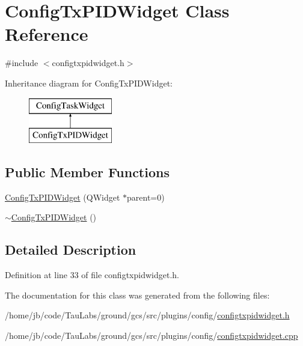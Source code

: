 \hypertarget{class_config_tx_p_i_d_widget}{\section{\-Config\-Tx\-P\-I\-D\-Widget \-Class \-Reference}
\label{class_config_tx_p_i_d_widget}
}


{\ttfamily \#include $<$configtxpidwidget.\-h$>$}

\-Inheritance diagram for \-Config\-Tx\-P\-I\-D\-Widget\-:\begin{figure}[H]
\begin{center}
\leavevmode
\includegraphics[height=2.000000cm]{class_config_tx_p_i_d_widget}
\end{center}
\end{figure}
\subsection*{\-Public \-Member \-Functions}
\begin{DoxyCompactItemize}
\item 
\hyperlink{group___config_plugin_ga2ecc01b090b6955e7204c19432ad8628}{\-Config\-Tx\-P\-I\-D\-Widget} (\-Q\-Widget $\ast$parent=0)
\item 
\hyperlink{group___config_plugin_ga2c39980676875ea742391215e79d5262}{$\sim$\-Config\-Tx\-P\-I\-D\-Widget} ()
\end{DoxyCompactItemize}


\subsection{\-Detailed \-Description}


\-Definition at line 33 of file configtxpidwidget.\-h.



\-The documentation for this class was generated from the following files\-:\begin{DoxyCompactItemize}
\item 
/home/jb/code/\-Tau\-Labs/ground/gcs/src/plugins/config/\hyperlink{configtxpidwidget_8h}{configtxpidwidget.\-h}\item 
/home/jb/code/\-Tau\-Labs/ground/gcs/src/plugins/config/\hyperlink{configtxpidwidget_8cpp}{configtxpidwidget.\-cpp}\end{DoxyCompactItemize}
